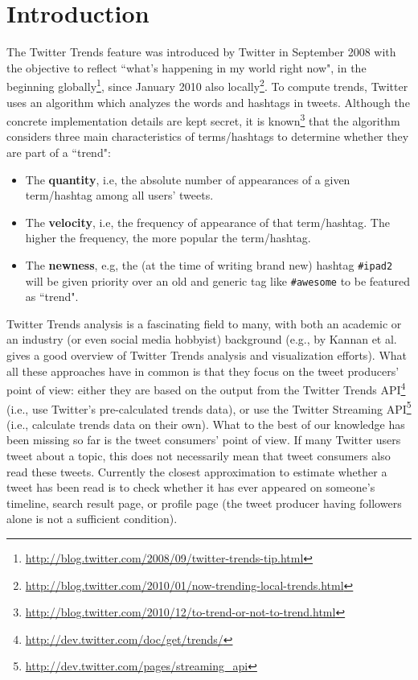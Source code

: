 \documentclass[runningheads,a4paper]{llncs}
\begin{document}
\section{Introduction}\label{sec:introduction}
The Twitter Trends feature was introduced by Twitter in September 2008 with the objective to reflect ``what's happening in my world right now", in the beginning globally\footnote{\url{http://blog.twitter.com/2008/09/twitter-trends-tip.html}}, since January 2010 also locally\footnote{\url{http://blog.twitter.com/2010/01/now-trending-local-trends.html}}. To compute trends, Twitter uses an algorithm which analyzes the words and hashtags in tweets. Although the concrete implementation details are kept secret, it is known\footnote{\url{http://blog.twitter.com/2010/12/to-trend-or-not-to-trend.html}} that the algorithm considers three main characteristics of terms/hashtags to determine whether they are part of a ``trend":

\begin{itemize}
\item The \textbf{quantity}, i.e, the absolute number of appearances of a given term/hashtag among all users' tweets.
\item The \textbf{velocity}, i.e, the frequency of appearance of that term/hashtag. The higher the frequency, the more popular the term/hashtag.
\item The \textbf{newness}, e.g, the (at the time of writing brand new) hashtag \texttt{\#ipad2} will be given priority over an old and generic tag like \texttt{\#awesome} to be featured as ``trend".
\end{itemize}

Twitter Trends analysis is a fascinating field to many, with both an academic or an industry (or even social media hobbyist) background (e.g., \cite{Kannan:Trendtracker} by Kannan et al. gives a good overview of Twitter Trends analysis and visualization efforts). What all these approaches have in common is that they focus on the tweet producers' point of view: either they are based on the output from the Twitter Trends API\footnote{\url{http://dev.twitter.com/doc/get/trends/}} (i.e., use Twitter's pre-calculated trends data), or use the Twitter Streaming API\footnote{\url{http://dev.twitter.com/pages/streaming_api}} (i.e., calculate trends data on their own). What to the best of our knowledge has been missing so far is the tweet consumers' point of view. If many Twitter users tweet about a topic, this does not necessarily mean that tweet consumers also read these tweets. Currently the closest approximation to estimate whether a tweet has been read is to check whether it has ever appeared on someone's timeline, search result page, or profile page (the tweet producer having followers alone is not a sufficient condition).
\end{document}
